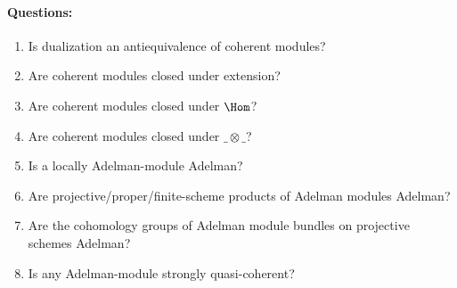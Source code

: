 \paragraph{Questions:}
\begin{enumerate}
\item Is dualization an antiequivalence of coherent modules?
\item Are coherent modules closed under extension?
\item Are coherent modules closed under $\Hom$?
\item Are coherent modules closed under $\_\otimes\_$?
\item \label{adelman-local} Is a locally Adelman-module Adelman?
\item Are projective/proper/finite-scheme products of Adelman modules Adelman?
\item Are the cohomology groups of Adelman module bundles on projective schemes Adelman?
\item Is any Adelman-module strongly quasi-coherent?
\end{enumerate}


